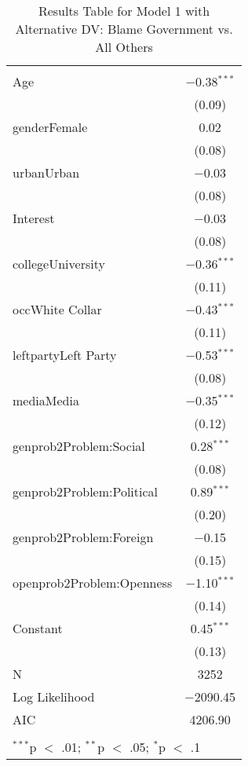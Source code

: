 
\begin{table}[!htbp] \centering 
  \caption{Results Table for Model 1 with Alternative DV: Blame Government vs. All Others} 
  \label{} 
\footnotesize 
\begin{tabular}{@{\extracolsep{5pt}}lc} 
\\[-1.8ex]\hline \\[-1.8ex] 
\hline \\[-1.8ex] 
 Age & $-$0.38$^{***}$ \\ 
  & (0.09) \\ 
  genderFemale & 0.02 \\ 
  & (0.08) \\ 
  urbanUrban & $-$0.03 \\ 
  & (0.08) \\ 
  Interest & $-$0.03 \\ 
  & (0.08) \\ 
  collegeUniversity & $-$0.36$^{***}$ \\ 
  & (0.11) \\ 
  occWhite Collar & $-$0.43$^{***}$ \\ 
  & (0.11) \\ 
  leftpartyLeft Party & $-$0.53$^{***}$ \\ 
  & (0.08) \\ 
  mediaMedia & $-$0.35$^{***}$ \\ 
  & (0.12) \\ 
  genprob2Problem:Social & 0.28$^{***}$ \\ 
  & (0.08) \\ 
  genprob2Problem:Political & 0.89$^{***}$ \\ 
  & (0.20) \\ 
  genprob2Problem:Foreign & $-$0.15 \\ 
  & (0.15) \\ 
  openprob2Problem:Openness & $-$1.10$^{***}$ \\ 
  & (0.14) \\ 
  Constant & 0.45$^{***}$ \\ 
  & (0.13) \\ 
 N & 3252 \\ 
Log Likelihood & $-$2090.45 \\ 
AIC & 4206.90 \\ 
\hline \\[-1.8ex] 
\multicolumn{2}{l}{$^{***}$p $<$ .01; $^{**}$p $<$ .05; $^{*}$p $<$ .1} \\ 
\end{tabular} 
\end{table} 
